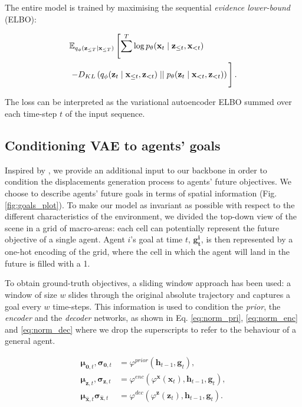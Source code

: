 \documentclass[10pt,a4paper,conference]{IEEEtran}
\begin{document}
The entire model is trained by maximising the sequential \textit{evidence lower-bound} (ELBO):


\begin{equation}
\label{eq:elbo_vrnn}
\begin{split}
    &\mathbb{E}_{q_{\phi}(\mathbf{z}_{\leq T} \mid \mathbf{x}_{\leq T})} 
    \left [
        \sum^{T} \log p_{\theta}(\mathbf{x}_{t} \mid \mathbf{z}_{\leq t}, \mathbf{x}_{<t}) \right. \\
            &
            \left. - D_{KL} \left ( 
                q_{\phi}(\mathbf{z}_{t} \mid \mathbf{x}_{\leq t}, \mathbf{z}_{< t}) \mid \mid p_{\theta}(\mathbf{z}_{t} \mid \mathbf{x}_{< t}, \mathbf{z}_{< t})
            \right ) 
    \vphantom{\sum^{T}} \right ].
\end{split}
\end{equation}

\bigbreak
The loss can be interpreted as the variational autoencoder ELBO summed over each time-step $t$ of the input sequence.


\subsection{Conditioning VAE to agents' goals}
Inspired by \cite{cvae,cvae2,weeksup,conditionalflow, where_will_they_go,Jiachen_IROS19}, we provide an additional input to our backbone in order to condition the displacements generation process to agents' future objectives.
We choose to describe agents' future goals in terms of spatial information (Fig. \ref{fig:goals_plot}). To make our model as invariant as possible with respect to the different characteristics of the environment, we divided the top-down view of the scene in a grid of macro-areas: each cell can potentially represent the future objective of a single agent. 
Agent $i$'s goal at time $t$, $\mathbf{g^i_t}$, is then represented by a one-hot encoding of the grid, where the cell in which the agent will land in the future is filled with a 1. 

To obtain ground-truth objectives, a sliding window approach has been used: a window of size $w$ slides through the original absolute trajectory and captures a goal every $w$ time-steps. This information is used to condition the \emph{prior}, the \emph{encoder} and the \emph{decoder} networks, as shown in Eq. \eqref{eq:norm_pri}, \eqref{eq:norm_enc} and \eqref{eq:norm_dec} where we drop the superscripts to refer to the behaviour of a general agent.

\begin{align}
    \label{eq:norm_pri}
    \pmb{\mu}_{\mathbf{0},t}, \pmb{\sigma}_{\mathbf{0},t} &= \varphi^{prior}\left(\mathbf{h}_{t-1},  \mathbf{g}_{t}\right), \\
    \label{eq:norm_enc} 
    \pmb{\mu}_{\mathbf{z},t}, \pmb{\sigma}_{\mathbf{z},t} &= \varphi^{enc}\left(\varphi^{\mathbf{x}}(\mathbf{x}_{t}), \mathbf{h}_{t-1}, \mathbf{g}_{t}\right), \\
    \label{eq:norm_dec}
    \pmb{\mu}_{\mathbf{\hat{x}},t} \pmb{\sigma}_{\mathbf{\hat{x}},t} &= \varphi^{dec}\left(\varphi^{\mathbf{z}}(\mathbf{z}_{t}), \mathbf{h}_{t-1}, \mathbf{g}_{t}\right).
\end{align}
\end{document}
